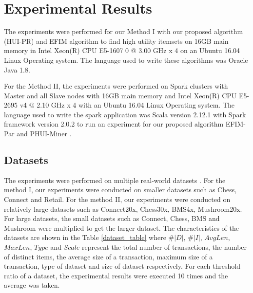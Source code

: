 \documentclass[11pt,openright]{report}
\begin{document}
%
%

\chapter{Experimental Results}
\label{chapter:experiment_results}
The experiments were performed for our Method I with our proposed algorithm (HUI-PR) and EFIM algorithm \cite{Zida2015} to find high utility itemsets on 16GB main memory in Intel Xeon(R) CPU E5-1607 0 @ 3.00 GHz x 4 on an Ubuntu 16.04 Linux Operating system. The language used to write these algorithms was Oracle Java 1.8. 

For the Method II, the experiments were performed on Spark clusters with Master and all Slave nodes with 16GB main memory and Intel Xeon(R) CPU E5-2695 v4 @ 2.10 GHz x 4 with an Ubuntu 16.04 Linux Operating system. The language used to write the spark application was Scala version 2.12.1 with Spark framework version 2.0.2 to run an experiment for our proposed algorithm EFIM-Par and PHUI-Miner \cite{Chen2016}.

\section{Datasets}
The experiments were performed on multiple real-world datasets \cite{miningdataset2012, SPMFDatasets}. For the method I, our experiments were conducted on smaller datasets such as Chess, Connect and Retail. For the method II, our experiments were conducted on relatively large datasets such as Connect20x, Chess30x, BMS4x, Mushroom20x. For large datasets, the small datasets such as Connect, Chess, BMS and Mushroom were multiplied to get the larger dataset. The characteristics of the datasets are shown in the Table \ref{dataset_table} where $\#|D|$, $\#|I|$, $AvgLen$, $MaxLen$, $Type$ and $Scale$ represent the total number of transactions, the number of distinct items, the average size of a transaction, maximum size of a transaction, type of dataset and size of dataset respectively. For each threshold ratio of a dataset, the experimental results were executed 10 times and the average was taken.
\end{document}
